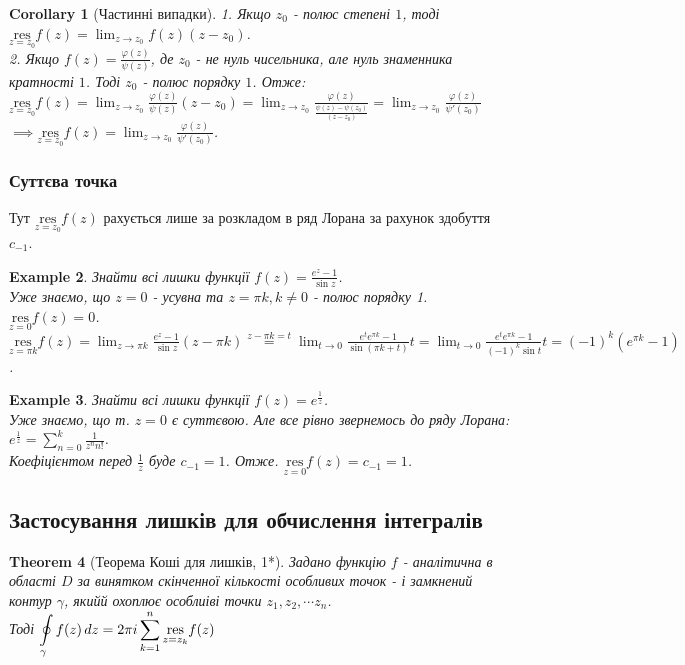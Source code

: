 \documentclass[a4paper, 10pt]{article}
\def\residue#1#2{\underset{z = {#1}}{\textrm{res}} {#2}}
\theoremstyle{theoremdd}
\newtheorem{theorem}{Theorem}[subsection]
\theoremstyle{theoremdd}
\theoremstyle{theoremdd}
\theoremstyle{theoremdd}
\newtheorem{example}[theorem]{Example}
\theoremstyle{theoremdd}
\theoremstyle{theoremdd}
\theoremstyle{theoremdd}
\theoremstyle{theoremdd}
\newtheorem{corollary}[theorem]{Corollary}
\begin{document}
\begin{corollary}[Частинні випадки]
1. Якщо $z_0$ - полюс степені $1$, тоді $\displaystyle \residue{z_0}{f(z)} = \lim_{z \to z_0} f(z)(z-z_0)$.
\bigskip \\
2. Якщо $\displaystyle f(z) = \frac{\varphi (z)}{\psi (z)}$, де $z_0$ - не нуль чисельника, але нуль знаменника кратності $1$. Тоді $z_0$ - полюс порядку $1$. Отже:\\
$\displaystyle \residue{z_0}{f(z)} = \lim_{z \to z_0} \frac{\varphi (z)}{\psi (z)} (z-z_0) = \lim_{z \to z_0} \frac{\varphi (z)}{\displaystyle\frac{\psi (z)-\psi (z_0)}{(z-z_0)}} = \lim_{z \to z_0} \frac{\varphi(z)}{\psi'(z_0)}$\\
$\implies \displaystyle \residue{z_0}{f(z)} = \lim_{z \to z_0} \frac{\varphi(z)}{\psi'(z_0)}$.
\end{corollary}

\subsubsection{Суттєва точка}
Тут $\residue{z_0}{f(z)}$ рахується лише за розкладом в ряд Лорана за рахунок здобуття $c_{-1}$.

\begin{example}
Знайти всі лишки функції $\displaystyle f(z) = \frac{e^z-1}{\sin z}$.\\
Уже знаємо, що $z = 0$ - усувна та $z = \pi k, k \neq 0$ - полюс порядку 1.\\
$\residue{0}{f(z)} = 0$.\\
$\displaystyle \residue{\pi k}{f(z)} = \lim_{z \to \pi k} \frac{e^z-1}{\sin z} (z - \pi k) \overset{z - \pi k = t}{=} \lim_{t \to 0} \frac{e^{t}e^{\pi k} - 1}{\sin{(\pi k + t)}} t = \lim_{t \to 0} \frac{e^{t}e^{\pi k} - 1}{(-1)^k\sin{t}} t = (-1)^k (e^{\pi k} - 1)$.
\end{example}

\begin{example}
Знайти всі лишки функції $\displaystyle f(z) = e^{\textstyle \frac{1}{z}}$.\\
Уже знаємо, що т. $z = 0$ є суттєвою. Але все рівно звернемось до ряду Лорана:\\
$\displaystyle e^{\textstyle \frac{1}{z}} = \sum_{n=0}^k \frac{1}{z^n n!}$.\\
Коефіцієнтом перед $\displaystyle \frac{1}{z}$ буде $c_{-1} = 1$. Отже. $\residue{0}{f(z)} = c_{-1} = 1$.
\end{example}

\subsection{Застосування лишків для обчислення інтегралів}
\begin{theorem}[Теорема Коші для лишків, 1*]
Задано функцію $f$ - аналітична в області $D$ за винятком скінченної кількості особливих точок - і замкнений контур $\gamma$, якийй охоплює особлиіві точки $z_1,z_2,\cdots z_n$. \\
Тоді $\displaystyle\oint\displaylimits_{\gamma} f(z)\,dz = 2 \pi i \sum_{k=1}^{n} \residue{z_k}{f(z)}$
\end{theorem}
\end{document}
